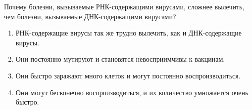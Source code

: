 
Почему болезни, вызываемые РНК-содержащими вирусами, сложнее вылечить, чем болезни, вызываемые ДНК-содержащими вирусами?

\begin{enumerate}
    \item РНК-содержащие вирусы так же трудно вылечить, как и ДНК-содержащие вирусы.
    \item Они постоянно мутируют и становятся невосприимчивы к вакцинам.
    \item Они быстро заражают много клеток и могут постоянно воспроизводиться.
    \item Они могут бесконечно воспроизводиться, и их количество умножается очень быстро.
\end{enumerate}

